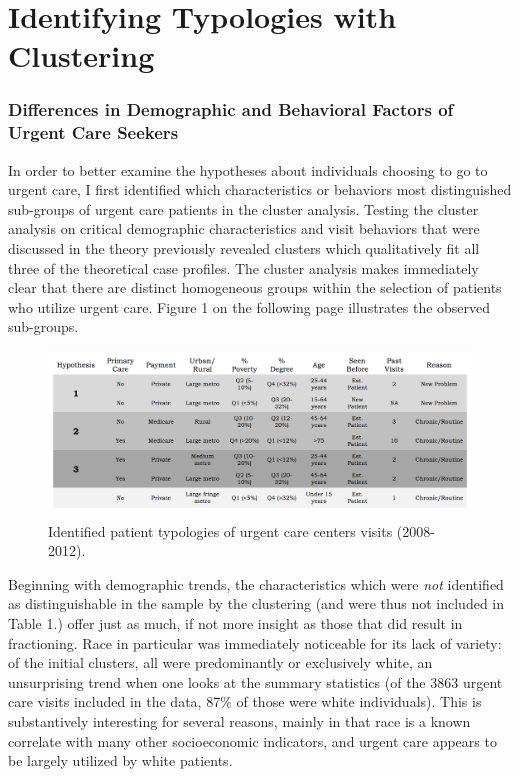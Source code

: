 \documentclass[12pt,twoside]{reedthesis}
\begin{document}
  \section*{Identifying Typologies with
  Clustering}\label{identifying-typologies-with-clustering}
  
  \subsubsection*{Differences in Demographic and Behavioral Factors of
  Urgent Care
  Seekers}\label{differences-in-demographic-and-behavioral-factors-of-urgent-care-seekers}
  
  In order to better examine the hypotheses about individuals choosing to
  go to urgent care, I first identified which characteristics or behaviors
  most distinguished sub-groups of urgent care patients in the cluster
  analysis. Testing the cluster analysis on critical demographic
  characteristics and visit behaviors that were discussed in the theory
  previously revealed clusters which qualitatively fit all three of the
  theoretical case profiles. The cluster analysis makes immediately clear
  that there are distinct homogeneous groups within the selection of
  patients who utilize urgent care. Figure 1 on the following page
  illustrates the observed sub-groups.
  
  \begin{figure}[h!]
  \centering
  \includegraphics[angle = 0,scale = 0.35]{figures/clusters.png}
  \caption[Identified patient typologies of urgent care centers visits (2008-2012).]{\small{Identified patient typologies of urgent care centers visits (2008-2012).}}
  \label{fig:clus1}
  \end{figure}
  
  Beginning with demographic trends, the characteristics which were
  \emph{not} identified as distinguishable in the sample by the clustering
  (and were thus not included in Table 1.) offer just as much, if not more
  insight as those that did result in fractioning. Race in particular was
  immediately noticeable for its lack of variety: of the initial clusters,
  all were predominantly or exclusively white, an unsurprising trend when
  one looks at the summary statistics (of the 3863 urgent care visits
  included in the data, 87\% of those were white individuals). This is
  substantively interesting for several reasons, mainly in that race is a
  known correlate with many other socioeconomic indicators, and urgent
  care appears to be largely utilized by white patients.
  
\end{document}
